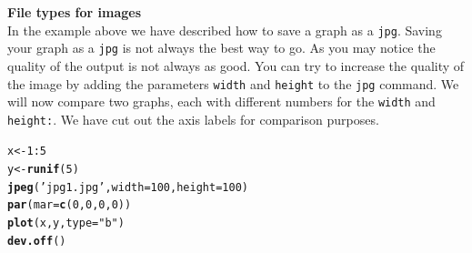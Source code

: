 \documentclass[12pt,a4paper]{article}\usepackage[]{graphicx}\usepackage[]{color}
\makeatletter
\newcommand{\hlnum}[1]{\textcolor[rgb]{0.686,0.059,0.569}{#1}}%
\newcommand{\hlstr}[1]{\textcolor[rgb]{0.192,0.494,0.8}{#1}}%
\newcommand{\hlopt}[1]{\textcolor[rgb]{0,0,0}{#1}}%
\newcommand{\hlstd}[1]{\textcolor[rgb]{0.345,0.345,0.345}{#1}}%
\newcommand{\hlkwb}[1]{\textcolor[rgb]{0.69,0.353,0.396}{#1}}%
\newcommand{\hlkwc}[1]{\textcolor[rgb]{0.333,0.667,0.333}{#1}}%
\newcommand{\hlkwd}[1]{\textcolor[rgb]{0.737,0.353,0.396}{\textbf{#1}}}%
\newenvironment{kframe}{%
 \def\at@end@of@kframe{}%
 \ifinner\ifhmode%
  \def\at@end@of@kframe{\end{minipage}}%
  \begin{minipage}{\columnwidth}%
 \fi\fi%
 \def\FrameCommand##1{\hskip\@totalleftmargin \hskip-\fboxsep
 \colorbox{shadecolor}{##1}\hskip-\fboxsep
     \hskip-\linewidth \hskip-\@totalleftmargin \hskip\columnwidth}%
 \MakeFramed {\advance\hsize-\width
   \@totalleftmargin\z@ \linewidth\hsize
   \@setminipage}}%
 {\par\unskip\endMakeFramed%
 \at@end@of@kframe}
\newenvironment{knitrout}{}{} %
\makeatother
\begin{document}
\begin{mdframed}
\textbf{File types for images}\\
In the example above we have described how to save a graph as a \texttt{jpg}. Saving your graph as a \texttt{jpg} is not always the best way to go. As you may notice the quality of the output is not always as good. You can try to increase the quality of the image by adding the parameters \texttt{width} and \texttt{height} to the \texttt{jpg} command. We will now compare two graphs, each with different numbers for the \texttt{width} and \texttt{height:}. We have cut out the axis labels for comparison purposes.

\begin{knitrout}
\color{fgcolor}\begin{kframe}
\begin{alltt}
\hlstd{x}\hlkwb{<-}\hlnum{1}\hlopt{:}\hlnum{5}
\hlstd{y}\hlkwb{<-}\hlkwd{runif}\hlstd{(}\hlnum{5}\hlstd{)}
\hlkwd{jpeg}\hlstd{(}\hlstr{'jpg1.jpg'}\hlstd{,}\hlkwc{width}\hlstd{=}\hlnum{100}\hlstd{,}\hlkwc{height}\hlstd{=}\hlnum{100}\hlstd{)}
\hlkwd{par}\hlstd{(}\hlkwc{mar}\hlstd{=}\hlkwd{c}\hlstd{(}\hlnum{0}\hlstd{,}\hlnum{0}\hlstd{,}\hlnum{0}\hlstd{,}\hlnum{0}\hlstd{))}
\hlkwd{plot}\hlstd{(x,y,}\hlkwc{type}\hlstd{=}\hlstr{"b"}\hlstd{)}
\hlkwd{dev.off}\hlstd{()}


\end{alltt}
\end{kframe}
\end{knitrout}
\end{mdframed}
\end{document}
